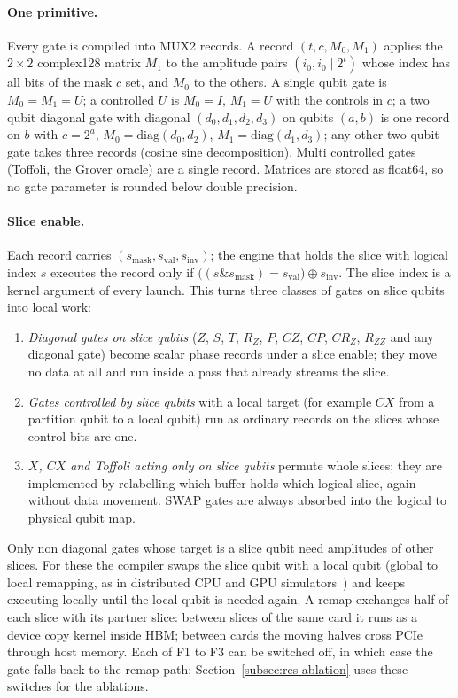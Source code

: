 \paragraph{One primitive.} Every gate is compiled into MUX2 records. A record $(t, c, M_0, M_1)$ applies the
$2\times 2$ complex128 matrix $M_1$ to the amplitude pairs $(i_0, i_0 \mathbin{|} 2^t)$ whose index has all bits of the
mask $c$ set, and $M_0$ to the others. A single qubit gate is $M_0 = M_1 = U$; a controlled $U$ is $M_0 = I$,
$M_1 = U$ with the controls in $c$; a two qubit diagonal gate with diagonal $(d_0,d_1,d_2,d_3)$ on qubits $(a,b)$ is one
record on $b$ with $c = 2^a$, $M_0 = \mathrm{diag}(d_0,d_2)$, $M_1 = \mathrm{diag}(d_1,d_3)$; any other two qubit gate
takes three records (cosine sine decomposition). Multi controlled gates (Toffoli, the Grover oracle) are a single
record. Matrices are stored as float64, so no gate parameter is rounded below double precision.

\paragraph{Slice enable.} Each record carries $(s_{\mathrm{mask}}, s_{\mathrm{val}}, s_{\mathrm{inv}})$; the
engine that holds the slice with logical index $s$ executes the record only if
$\bigl((s \mathbin{\&} s_{\mathrm{mask}}) = s_{\mathrm{val}}\bigr) \oplus s_{\mathrm{inv}}$. The slice index is a
kernel argument of every launch. This turns three classes of gates on slice qubits into local work:
\begin{enumerate}
\item[F1] \emph{Diagonal gates on slice qubits} ($Z$, $S$, $T$, $R_Z$, $P$, $CZ$, $CP$, $CR_Z$, $R_{ZZ}$ and any diagonal
gate) become scalar phase records under a slice enable; they move no data at all and run inside a pass that already
streams the slice.
\item[F2] \emph{Gates controlled by slice qubits} with a local target (for example $CX$ from a partition qubit to a
local qubit) run as ordinary records on the slices whose control bits are one.
\item[F3] \emph{$X$, $CX$ and Toffoli acting only on slice qubits} permute whole slices; they are implemented by
relabelling which buffer holds which logical slice, again without data movement. SWAP gates are always absorbed into
the logical to physical qubit map.
\end{enumerate}
Only non diagonal gates whose target is a slice qubit need amplitudes of other slices. For these the compiler swaps
the slice qubit with a local qubit (global to local remapping, as in distributed CPU and GPU
simulators~\cite{haner2017petabyte,deraedt2019massively,imamura2022mpiqulacs}) and keeps executing locally until the
local qubit is needed again. A remap exchanges half of each slice with its partner slice: between slices of the same
card it runs as a device copy kernel inside HBM; between cards the moving halves cross PCIe through host memory.
Each of F1 to F3 can be switched off, in which case the gate falls back to the remap path; Section~\ref{subsec:res-ablation}
uses these switches for the ablations.

